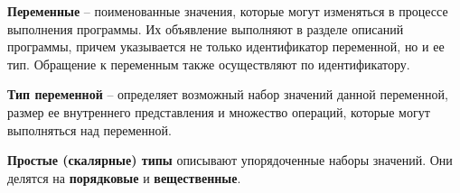 {\bf{Переменные}} – поименованные значения, которые могут изменяться в процессе выполнения программы. Их объявление выполняют в разделе описаний программы, причем указывается не только идентификатор переменной, но и ее тип. Обращение к переменным также осуществляют по идентификатору.

{\bf{Тип переменной}} – определяет возможный набор значений данной переменной, размер ее внутреннего представления и множество операций, которые могут выполняться над переменной.


{\bf Простые (скалярные) типы} описывают упорядоченные наборы значений. Они делятся на {\bf порядковые} и {\bf вещественные}.




